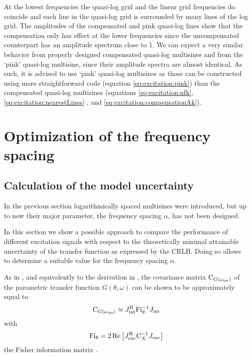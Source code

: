  At the lowest frequencies the quasi-log grid and the linear grid frequencies do coincide and each line in the quasi-log grid is surrounded by many lines of the log grid.
  The amplitudes of the compensated and pink quasi-log lines show that the compensation only has effect at the lower frequencies since the uncompensated counterpart has an amplitude spectrum close to $1$.
  We can expect a very similar behavior from properly designed compensated quasi-log multisines and from the `pink' quasi-log multisine, since their amplitude spectra are almost identical.
  As such, it is advised to use `pink' quasi-log multisines as those can be constructed using more straightforward code (equation \eqref{eq:excitation:pink}) than the compensated quasi-log multisines (equations \eqref{eq:excitation:nfk}, \eqref{eq:excitation:nearestLines} , and \eqref{eq:excitation:compensationAk}).

\section{Optimization of the frequency spacing} 
\label{sec:excitation:optimAlpha}
  \subsection{Calculation of the model uncertainty}
  In the previous section logarithmically spaced multisines were introduced, but up to now their major parameter, the frequency spacing $\alpha$, has not been designed.

  In this section we show a possible approach to compare the performance of different excitation signals with respect to the theoretically minimal attainable uncertainty of the transfer function as expressed by the \gls{CRLB}.
  Doing so allows to determine a suitable value for the frequency spacing $\alpha$.

  As in \citep{Pintelon2012, Gallager2008, matrixcookbook}, and equivalently to the derivation in , the covariance matrix $\mathrm{C}_{G\left(\omega_{\mathrm{int}}\right)}$ of the parametric transfer function $G(\theta,\omega)$ can be shown to be approximately equal to
  \begin{align}
    \C_{G\left( \omega_{\interest}\right) } \approx
      \InnerQuadraticForm[\HT]
                         {\jac{\interest}}
                         {\FisherInformation_{\theta}^{-1}}
     \label{eq:excitation:varPeak}
  \end{align}
  with 
  \begin{equation}
    \FisherInformation_{\theta} =
    2
    \real{
          \InnerQuadraticForm[\HT]
                              {\jac{\excited}}
                              {\C_{X}^{-1}}
          }
    \label{eq:excitation:FisherInfo}
  \end{equation}
  the Fisher information matrix \citep{Pintelon2012}.

